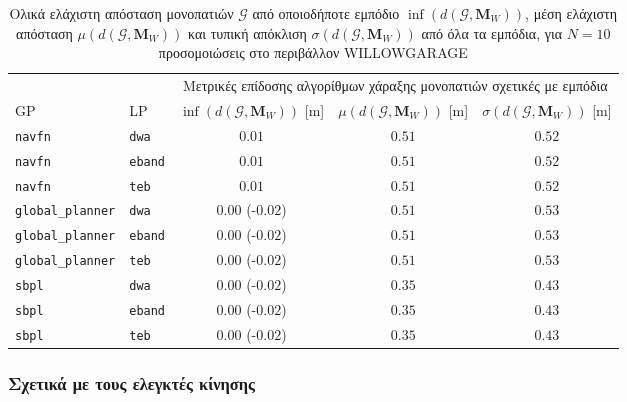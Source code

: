\begin{table}[h]\hspace{-1.0cm}
\renewcommand{\arraystretch}{1.3}
\begin{tabular}{llccc}
  & & \multicolumn{3}{c}{Μετρικές επίδοσης αλγορίθμων χάραξης μονοπατιών σχετικές με εμπόδια} \\
  \cline{3-5}
  GP & LP & $\inf(d(\bm{\mathcal{G}},\bm{M}_W))$ [m] & $\mu(d(\bm{\mathcal{G}},\bm{M}_W))$ [m] & $\sigma(d(\bm{\mathcal{G}},\bm{M}_W))$ [m] \\ \toprule
  \texttt{navfn} & \texttt{dwa} & $0.01$ & $0.51$ & $0.52$ \\
  \texttt{navfn} & \texttt{eband} & $0.01$ & $0.51$ & $0.52$ \\
  \texttt{navfn} & \texttt{teb} & $0.01$ & $0.51$ & $0.52$ \\
  \texttt{global\_planner} & \texttt{dwa} & \hspace{1.1cm} $0.00$ (-$0.02$) & $0.51$ & $0.53$ \\
  \texttt{global\_planner} & \texttt{eband} & \hspace{1.1cm} $0.00$ (-$0.02$) & $0.51$ & $0.53$ \\
  \texttt{global\_planner} & \texttt{teb} & \hspace{1.1cm} $0.00$ (-$0.02$) & $0.51$ & $0.53$ \\
  \texttt{sbpl} & \texttt{dwa} & \hspace{1.1cm} $0.00$ (-$0.02$) & $0.35$ & $0.43$ \\
  \texttt{sbpl} & \texttt{eband} & \hspace{1.1cm} $0.00$ (-$0.02$) & $0.35$ & $0.43$ \\
  \texttt{sbpl} & \texttt{teb} & \hspace{1.1cm} $0.00$ (-$0.02$) & $0.35$ & $0.43$ \\ \bottomrule
\end{tabular}
\caption{\small Ολικά ελάχιστη απόσταση μονοπατιών $\bm{\mathcal{G}}$ από
         οποιοδήποτε εμπόδιο $\inf(d(\bm{\mathcal{G}},\bm{M}_W))$, μέση
         ελάχιστη απόσταση $\mu(d(\bm{\mathcal{G}},\bm{M}_W))$ και τυπική
         απόκλιση $\sigma(d(\bm{\mathcal{G}},\bm{M}_W))$ από όλα τα εμπόδια,
         για $N=10$ προσομοιώσεις στο περιβάλλον WILLOWGARAGE}
\label{tbl:info_global_plan_map_willowgarage}
\end{table}


\subsubsection{Σχετικά με τους ελεγκτές κίνησης}

